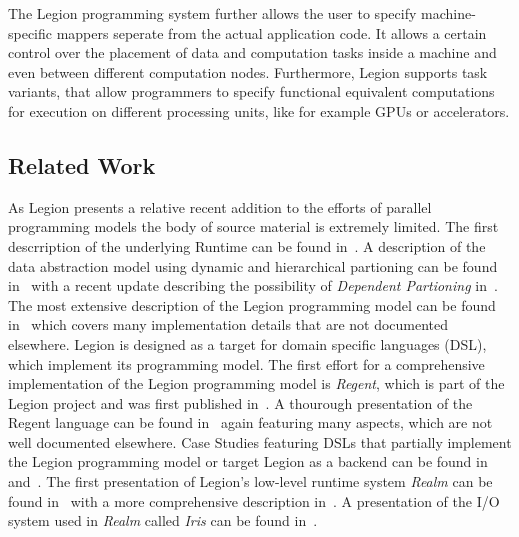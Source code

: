 \documentclass{article}      %
\begin{document}
The Legion programming system further allows the user to specify machine-specific mappers seperate from the actual application code. It allows a certain control over the placement of data and computation tasks inside a machine and even between different computation nodes. Furthermore, Legion supports task variants, that allow programmers to specify functional equivalent computations for execution on different processing units, like for example GPUs or accelerators.

\subsection{Related Work}
As Legion presents a relative recent addition to the efforts of parallel programming models the body of source material is extremely limited. The first descrription of the underlying Runtime can be found in~\cite{LegionPaper}. A description of the data abstraction model using dynamic and hierarchical partioning can be found in~\cite{LanguageSupport} with a recent update describing the possibility of \emph{Dependent Partioning} in~\cite{DependentPartitioning}. The most extensive description of the Legion programming model can be found in~\cite{BauerThesis} which covers many implementation details that are not documented elsewhere. Legion is designed as a target for domain specific languages (DSL), which implement its programming model. The first effort for a comprehensive implementation of the Legion programming model is \emph{Regent}, which is part of the Legion project and was first published in~\cite{regentPaper}. A thourough presentation of the Regent language can be found in~\cite{SlaughterThesis} again featuring many aspects, which are not well documented elsewhere. Case Studies featuring DSLs that partially implement the Legion programming model or target Legion as a backend can be found in~\cite{singe} and~\cite{mccormick2014exploring}. The first presentation of Legion's low-level runtime system \emph{Realm} can be found in~\cite{Realm} with a more comprehensive description in~\cite{TreichlerThesis}. A presentation of the I/O system used in \emph{Realm} called \emph{Iris} can be found in~\cite{RealmIris}.
\end{document}
